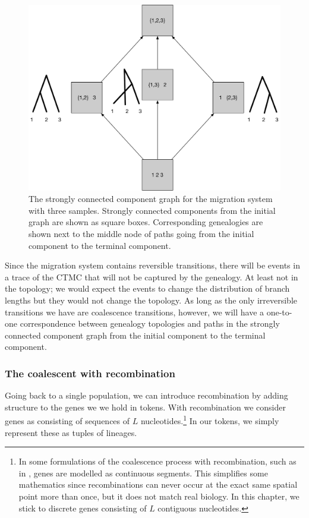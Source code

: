 \documentclass[graybox]{svmult}
\begin{document}
\begin{figure}[h]
\sidecaption
\includegraphics[scale=.20]{figures/migration-SCC-graph}
\caption{The strongly connected component graph for the migration system with three samples. Strongly connected components from the initial graph are shown as square boxes. Corresponding genealogies are shown next to the middle node of paths going from the initial component to the terminal component.}
\label{fig:migration-SCC-graph}
\end{figure}

Since the migration system contains reversible transitions, there will be events in a trace of the CTMC that will not be captured by the genealogy. At least not in the topology; we would expect the events to change the distribution of branch lengths but they would not change the topology. As long as the only irreversible transitions we have are coalescence transitions, however, we will have a one-to-one correspondence between genealogy topologies and paths in the strongly connected component graph from the initial component to the terminal component.


\subsubsection{The coalescent with recombination}

Going back to a single population, we can introduce recombination by adding structure to the genes we we hold in tokens. With recombination we consider genes as consisting of sequences of $L$ nucleotides.\footnote{In some formulations of the coalescence process with recombination, such as in \citet{Hein:2004ta}, genes are modelled as continuous segments. This simplifies some mathematics since recombinations can never occur at the exact same spatial point more than once, but it does not match real biology. In this chapter, we stick to discrete genes consisting of $L$ contiguous nucleotides.} In our tokens, we simply represent these as tuples of lineages. 
\end{document}
